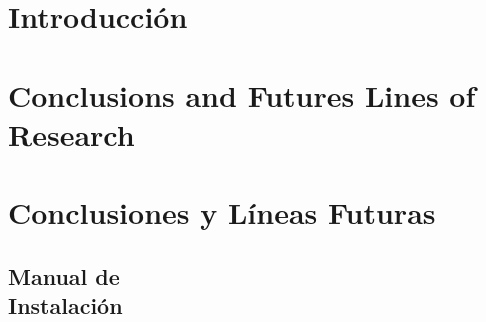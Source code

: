 \documentclass[12pt, a4paper, twoside]{article}
\begin{document}


\clearpage
\setcounter{page}{1}

\newpage



\tableofcontents

\section{Introducción}


\section{Conclusions and Futures Lines of Research}


\section{Conclusiones y Líneas Futuras}


\printbibliography

\newpage

\begin{umaappendices}
  \section{Manual de \\ Instalación}

\end{umaappendices}


\end{document}
